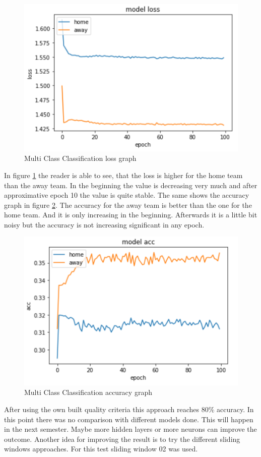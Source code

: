 \begin{figure}[H]
\begin{center}
\includegraphics[scale=1.5]{images/mccloss.PNG}
\end{center}
\caption{Multi Class Classification loss graph}
\label{mccloss}
\end{figure}

In figure \ref{mccloss} the reader is able to see, that the loss is higher for the home team than the away team. In the beginning the value is decreasing very much and after approximative epoch 10 the value is quite stable. The same shows the accuracy graph in figure \ref{mccacc}. The accuracy for the away team is better than the one for the home team. And it is only increasing in the beginning. Afterwards it is a little bit noisy but the accuracy is not increasing significant in any epoch. 

\begin{figure}[H]
\begin{center}
\includegraphics[scale=1.5]{images/mccacc.PNG}
\end{center}
\caption{Multi Class Classification accuracy graph}
\label{mccacc}
\end{figure}

After using the own built quality criteria this approach reaches 80\% accuracy. In this point there was no comparison with different models done. This will happen in the next semester. Maybe more hidden layers or more neurons can improve the outcome. Another idea for improving the result is to try the different sliding windows approaches. For this test sliding window 02 was used. 



